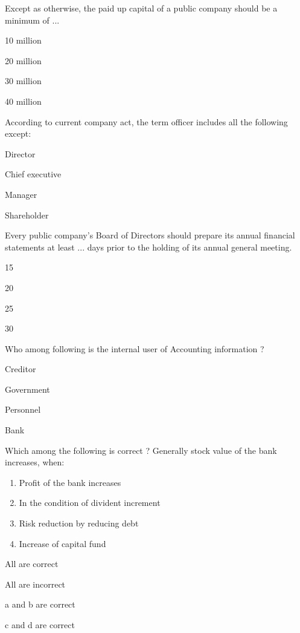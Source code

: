 \begin{questions}
\question Except as otherwise, the paid up capital of a public company should be a minimum of ...
  \begin{items}
  \item 10 million
  \item 20 million
  \item 30 million
  \item 40 million
  \end{items}

\question According to current company act, the term officer includes all the following except:
  \begin{items}
  \item Director
  \item Chief executive
  \item Manager
  \item Shareholder
  \end{items}

\question Every public company's Board of Directors should prepare its annual financial statements at least ... days prior to the holding of its annual general meeting.
  \begin{items}
  \item 15
  \item 20
  \item 25
  \item 30
  \end{items}

\question Who among following is the internal user of Accounting information ?
  \begin{items}
  \item Creditor
  \item Government
  \item Personnel
  \item Bank
  \end{items}

\question Which among the following is correct ? Generally stock value of the bank increases, when:
  \begin{enumerate}
  \item Profit of the bank increases
  \item In the condition of divident increment
  \item Risk reduction by reducing debt
  \item Increase of capital fund
  \end{enumerate}
  \begin{items}
  \item All are correct
  \item All are incorrect
  \item a and b are correct
  \item c and d are correct
  \end{items}


\end{questions}
